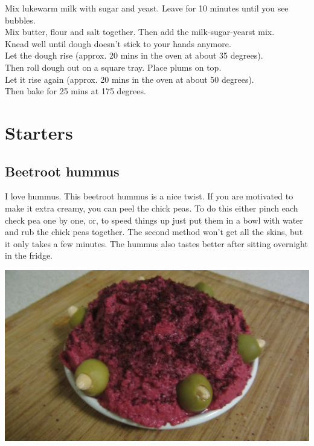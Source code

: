 \documentclass{tufte-book}
\begin{document}
\smallskip
Mix lukewarm milk with sugar and yeast. Leave for 10 minutes until you see bubbles. 
\\Mix butter, flour and salt together. Then add the milk-sugar-yearst mix.
\\Knead well until dough doesn't stick to your hands anymore.
\\Let the dough rise (approx. 20 mins in the oven at about 35 degrees).
\\Then roll dough out on a square tray. Place plums on top. 
\\Let it rise again (approx. 20 mins in the oven at about 50 degrees).
\\Then bake for 25 mins at 175 degrees.

\chapter{Starters}
\section{Beetroot hummus}

I love hummus. This beetroot hummus is a nice twist. If you are motivated to make it extra creamy, you can peel the chick peas. To do this either pinch each check pea one by one, or, to speed things up just put them in a bowl with water and rub the chick peas together. The second method won't get all the skins, but it only takes a few minutes. The hummus also tastes better after sitting overnight in the fridge.

\begin{marginfigure}%
  \includegraphics[width=\linewidth]{beetroothummus.png}
\end{marginfigure}
\end{document}
